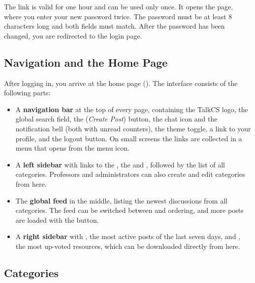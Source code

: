 The link is valid for one hour and can be used only once. It opens the
 page, where you enter your new password twice. The password
must be at least 8 characters long and both fields must match. After the password has
been changed, you are redirected to the login page.


\subsection{Navigation and the Home Page}

After logging in, you arrive at the home page (\route{/}). The interface consists of
the following parts:

\begin{itemize}
  \item A \textbf{navigation bar} at the top of every page, containing the TalkCS logo,
    the global search field, the \ui{+} (\emph{Create Post}) button, the chat icon and the
    notification bell (both with unread counters), the theme toggle, a link to your
    profile, and the logout button. On small screens the links are collected in a
    menu that opens from the menu icon.
  \item A \textbf{left sidebar} with links to the , the
     and , followed by the list of all categories.
    Professors and administrators can also create and edit categories from here.
  \item The \textbf{global feed} in the middle, listing the newest discussions from all
    categories. The feed can be switched between  and 
    ordering, and more posts are loaded with the  button.
  \item A \textbf{right sidebar} with , the most active posts of the
    last seven days, and , the most up-voted resources, which
    can be downloaded directly from here.
\end{itemize}


\subsection{Categories}

